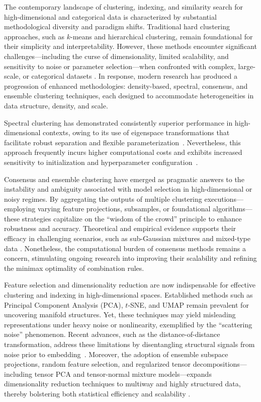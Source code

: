 \documentclass[sigconf]{acmart}
\begin{document}
The contemporary landscape of clustering, indexing, and similarity search for high-dimensional and categorical data is characterized by substantial methodological diversity and paradigm shifts. Traditional hard clustering approaches, such as $k$-means and hierarchical clustering, remain foundational for their simplicity and interpretability. However, these methods encounter significant challenges—including the curse of dimensionality, limited scalability, and sensitivity to noise or parameter selection—when confronted with complex, large-scale, or categorical datasets \cite{ref20,ref29,ref80}. In response, modern research has produced a progression of enhanced methodologies: density-based, spectral, consensus, and ensemble clustering techniques, each designed to accommodate heterogeneities in data structure, density, and scale.

Spectral clustering has demonstrated consistently superior performance in high-dimensional contexts, owing to its use of eigenspace transformations that facilitate robust separation and flexible parameterization~\cite{ref64}. Nevertheless, this approach frequently incurs higher computational costs and exhibits increased sensitivity to initialization and hyperparameter configuration~\cite{ref81,ref14,ref19}.

Consensus and ensemble clustering have emerged as pragmatic answers to the instability and ambiguity associated with model selection in high-dimensional or noisy regimes. By aggregating the outputs of multiple clustering executions—employing varying feature projections, subsamples, or foundational algorithms—these strategies capitalize on the ``wisdom of the crowd'' principle to enhance robustness and accuracy. Theoretical and empirical evidence supports their efficacy in challenging scenarios, such as sub-Gaussian mixtures and mixed-type data \cite{ref20,ref39,ref30,ref76,ref111}. Nonetheless, the computational burden of consensus methods remains a concern, stimulating ongoing research into improving their scalability and refining the minimax optimality of combination rules.

Feature selection and dimensionality reduction are now indispensable for effective clustering and indexing in high-dimensional spaces. Established methods such as Principal Component Analysis (PCA), $t$-SNE, and UMAP remain prevalent for uncovering manifold structures. Yet, these techniques may yield misleading representations under heavy noise or nonlinearity, exemplified by the ``scattering noise'' phenomenon. Recent advances, such as the distance-of-distance transformation, address these limitations by disentangling structural signals from noise prior to embedding~\cite{ref112}. Moreover, the adoption of ensemble subspace projections, random feature selection, and regularized tensor decompositions—including tensor PCA and tensor-normal mixture models—expands dimensionality reduction techniques to multiway and highly structured data, thereby bolstering both statistical efficiency and scalability \cite{ref40,ref88,ref89,ref90}.
\end{document}
